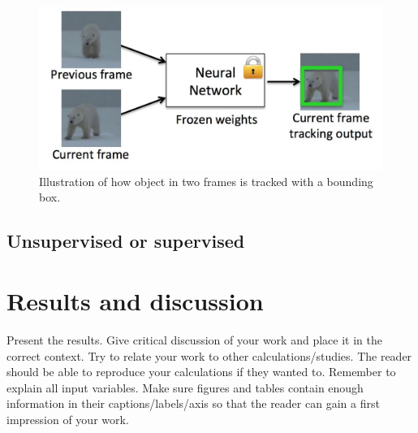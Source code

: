 \documentclass[english, a4paper]{report}
\begin{document}
\begin{figure}[H]
  \begin{center}
    \includegraphics[width=\textwidth]{object-tracking.jpg}
    \caption{Illustration of how object in two frames is tracked with a bounding box. \cite{GOTURNDeep} }
    \label{fig:object-tracking}
  \end{center}
\end{figure}
 

\subsection{Unsupervised or supervised}





\section{Results and discussion}
Present the results. Give critical discussion of your work and place it in the correct context. Try to relate your work to other calculations/studies. The reader should be able to reproduce your calculations if they wanted to. Remember to explain all input variables. Make sure figures and tables contain enough information in their captions/labels/axis so that the reader can gain a first impression of your work.





\newpage
\printbibliography
\end{document}
